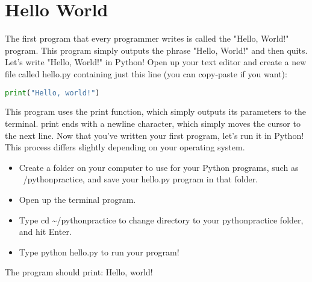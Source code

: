 \section{Hello World}
The first program that every programmer writes is called the "Hello, World!"
program. This program simply outputs the phrase "Hello, World!" and then quits.
Let's write "Hello, World!" in Python!  Open up your text editor and create a
new file called hello.py containing just this line (you can copy-paste if you
want): 
\lstset{basicstyle=\scriptsize, numbers=left, captionpos=b, tabsize=4}
\begin{lstlisting}[caption=Fibonacci,language={Python},
xleftmargin=15pt, label=lst:fibonacci]
print("Hello, world!")
\end{lstlisting}
This program uses the print function, which
simply outputs its parameters to the terminal. print ends with a newline
character, which simply moves the cursor to the next line.  Now that you've
written your first program, let's run it in Python! This process differs
slightly depending on your operating system.
\begin{itemize}
	\item Create a folder on your computer to use for your Python programs,
such as ~/pythonpractice, and save your hello.py program in that folder.
	\item Open up the terminal program.
	\item Type cd \textasciitilde /pythonpractice to change directory to your 
pythonpractice folder, and hit Enter.
	\item Type python hello.py to run your program!
\end{itemize}

The program should print: Hello, world! 
